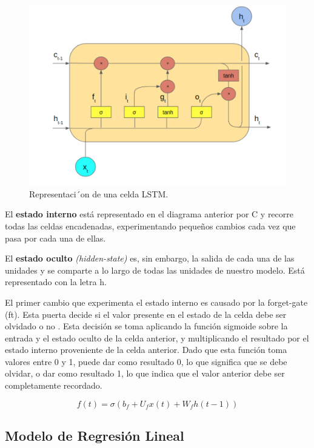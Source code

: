 \begin{figure}[H]
  \begin{center}
    \includegraphics[scale=0.70]{./lstm_grafico.png}
    \caption{Representaci´on de una celda LSTM.}
    \label{fig:lstm_grafico}
  \end{center}
\end{figure}

El \textbf{estado interno} está representado en el diagrama anterior por C y recorre todas las celdas encadenadas, experimentando pequeños cambios cada vez que pasa por cada una de ellas.

El \textbf{estado oculto} \textit{(hidden-state)} es, sin embargo, la salida de cada una de las unidades y se comparte a lo largo de todas las unidades de nuestro modelo. Está representado con la letra h.

El primer cambio que experimenta el estado interno es causado por la forget-gate (ft). Esta puerta decide si el valor presente en el estado de la celda debe ser olvidado o no  \cite{roman2018redes}. Esta decisión se toma aplicando la función sigmoide sobre la entrada y el estado oculto de la celda anterior, y multiplicando el resultado por el estado interno proveniente de la celda anterior. Dado que esta función toma valores entre 0 y 1, puede dar como resultado 0, lo que significa que se debe olvidar, o dar como resultado 1, lo que indica que el valor anterior debe ser completamente recordado.

\[f(t) = \sigma \left( b_f + U_f x(t) + W_f h(t-1) \right)\]

\subsection{Modelo de Regresión Lineal}

